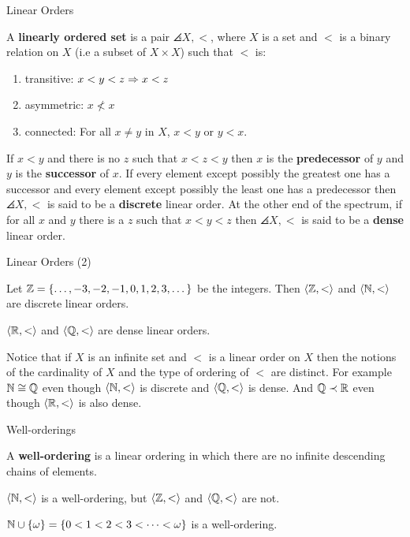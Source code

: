 \documentclass[pdf,final]{prosper}
\newcommand{\skipsmall}{\vspace{1em}}
\newcommand{\skipmed}{\vspace{2em}}
\begin{document}
\begin{slide}{Linear Orders}
\begin{definition}
A \textbf{linearly ordered set} is a pair $\angles{X,<}$, where $X$ is a set and
$<$ is a binary relation on $X$ (i.e a subset of $X\times X$) such that $<$ is:
\begin{enumerate}
  \item transitive: $x<y<z\Rightarrow x<z$
  \item asymmetric: $x\not<x$
  \item connected: For all $x\not= y$ in $X$, $x<y$ or $y<x$.
\end{enumerate}
If $x<y$ and there is no $z$ such that $x<z<y$ then $x$ is the
\textbf{predecessor} of $y$	 and $y$ is the \textbf{successor} of $x$. If every
element except possibly the greatest one has a successor and every element
except possibly the least one has a predecessor then $\angles{X,<}$ is said to be a
\textbf{discrete} linear order. At the other end of the spectrum, if for
all $x$ and $y$ there is a $z$
such that $x<y<z$ then $\angles{X,<}$ is said to be a \textbf{dense} linear order.
\end{definition}
\end{slide}

\begin{slide}{Linear Orders (2)}
\begin{example}
Let $\mathbb{Z}=\left\{\dots,-3,-2,-1,0,1,2,3,\dots\right\}$ be the integers. Then
$\left\langle \mathbb{Z},< \right\rangle$ and $\left\langle \mathbb{N},< \right\rangle$ are discrete linear orders.
\end{example}

\skipsmall

\begin{example}
$\left\langle \mathbb{R},< \right\rangle$ and $\left\langle \mathbb{Q},< \right\rangle$ are dense linear orders.
\end{example}

\skipsmall

Notice that if $X$ is an infinite set and $<$ is a linear order on $X$ then the
notions of the cardinality of $X$ and the type of ordering of $<$ are distinct.
For example $\mathbb{N}\cong \mathbb{Q}$ even though $\left\langle \mathbb{N},< \right\rangle$ is discrete and
$\left\langle \mathbb{Q},< \right\rangle$ is dense. And $\mathbb{Q}\prec\mathbb{R}$ even though $\left\langle \mathbb{R},< \right\rangle$ is also
dense. 

\end{slide}

\begin{slide}{Well-orderings}
\begin{definition}
A \textbf{well-ordering} is a linear ordering in which there are no infinite
descending chains of elements.
\end{definition}

\skipmed

\begin{example}
$\left\langle \mathbb{N},< \right\rangle$ is a well-ordering, but $\left\langle \mathbb{Z},< \right\rangle$ and $\left\langle \mathbb{Q},< \right\rangle$ are not.
\end{example}

\begin{example}
$\mathbb{N}\cup\left\{\omega\right\}=\left\{0<1<2<3<\dots<\omega\right\}$ is a well-ordering.
\end{example}

\end{slide}
\end{document}
